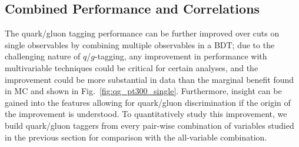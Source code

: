 \subsection{Combined Performance and Correlations}\label{sec:qg_combi}
The quark/gluon tagging performance can be further improved over cuts on single observables by 
combining multiple observables in a BDT; due to the challenging nature of $q$/$g$-tagging, any
improvement in performance with multivariable techniques could be critical for certain analyses, and the 
improvement could be more substantial in data than the marginal benefit found in MC  and shown
in Fig.~\ref{fig:qg_pt300_single}.
 Furthermore, insight can be gained into the 
features allowing for quark/gluon discrimination if the origin of the improvement  is
understood. To quantitatively study this improvement, we build quark/gluon taggers from
every pair-wise combination of variables studied in the previous section for comparison
with the all-variable combination. 

